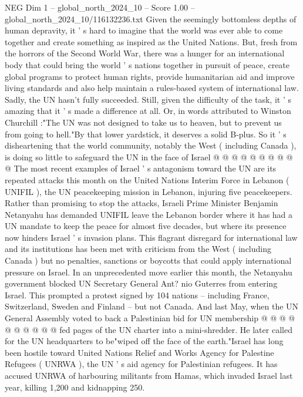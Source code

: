 \begin{textsample}{NEG Dim 1 – global\_north\_2024\_10 – Score 1.00 – global\_north\_2024\_10/116132236.txt}  \label{ex:f1_neg_373}
Given the seemingly bottomless depths of human depravity, it ' s hard to imagine that the world was ever able to come together and create something as inspired as the United Nations.
But, fresh from the horrors of the Second World War, there was a hunger for an international body that could bring the world ' s nations together in pursuit of peace, create global programs to protect human rights, provide humanitarian aid and improve living standards and also help maintain a rules-based system of international law.
Sadly, the UN hasn't fully succeeded.
Still, given the difficulty of the task, it ' s amazing that it ' s made a difference at all.
Or, in words attributed to Winston Churchill :"The UN was not designed to take us to heaven, but to prevent us from going to hell."By that lower yardstick, it deserves a solid B-plus.
So it ' s disheartening that the world community, notably the West ( including Canada ), is doing so little to safeguard the UN in the face of Israel @ @ @ @ @ @ @ @ @ @ The most recent examples of Israel ' s antagonism toward the UN are its repeated attacks this month on the United Nations Interim Force in Lebanon ( UNIFIL ), the UN peacekeeping mission in Lebanon, injuring five peacekeepers.
Rather than promising to stop the attacks, Israeli Prime Minister Benjamin Netanyahu has demanded UNIFIL leave the Lebanon border where it has had a UN mandate to keep the peace for almost five decades, but where its presence now hinders Israel ' s invasion plans.
This flagrant disregard for international law and its institutions has been met with criticism from the West ( including Canada ) but no penalties, sanctions or boycotts that could apply international pressure on Israel.
In an unprecedented move earlier this month, the Netanyahu government blocked UN Secretary General Ant? nio Guterres from entering Israel.
This prompted a protest signed by 104 nations -- including France, Switzerland, Sweden and Finland -- but not Canada.
And last May, when the UN General Assembly voted to back a Palestinian bid for UN membership @ @ @ @ @ @ @ @ @ @ fed pages of the UN charter into a mini-shredder.
He later called for the UN headquarters to be"wiped off the face of the earth."Israel has long been hostile toward United Nations Relief and Works Agency for Palestine Refugees ( UNRWA ), the UN ' s aid agency for Palestinian refugees.
It has accused UNRWA of harbouring militants from Hamas, which invaded Israel last year, killing 1,200 and kidnapping 250.

\end{textsample}
